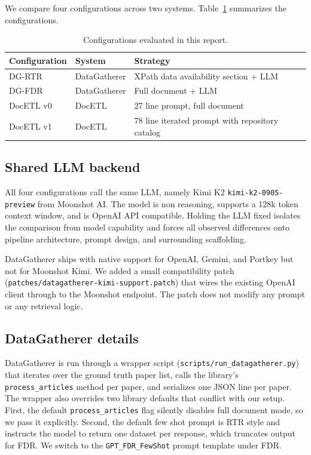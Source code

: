 \documentclass[sigconf,nonacm]{acmart}
\begin{document}
We compare four configurations across two systems. Table~\ref{tab:configs} summarizes the configurations.

\begin{table}[h]
\centering
\small
\begin{tabular}{lll}
\toprule
\textbf{Configuration} & \textbf{System} & \textbf{Strategy} \\
\midrule
DG-RTR     & DataGatherer & XPath data availability section + LLM \\
DG-FDR     & DataGatherer & Full document + LLM \\
DocETL v0  & DocETL       & 27 line prompt, full document \\
DocETL v1  & DocETL       & 78 line iterated prompt with repository catalog \\
\bottomrule
\end{tabular}
\caption{Configurations evaluated in this report.}
\label{tab:configs}
\end{table}

\subsection{Shared LLM backend}

All four configurations call the same LLM, namely Kimi K2 \texttt{kimi-k2-0905-preview} from Moonshot AI. The model is non reasoning, supports a 128k token context window, and is OpenAI API compatible. Holding the LLM fixed isolates the comparison from model capability and forces all observed differences onto pipeline architecture, prompt design, and surrounding scaffolding.

DataGatherer ships with native support for OpenAI, Gemini, and Portkey but not for Moonshot Kimi. We added a small compatibility patch (\texttt{patches/datagatherer-kimi-support.patch}) that wires the existing OpenAI client through to the Moonshot endpoint. The patch does not modify any prompt or any retrieval logic.

\subsection{DataGatherer details}

DataGatherer is run through a wrapper script (\texttt{scripts/run\_datagatherer.py}) that iterates over the ground truth paper list, calls the library's \texttt{process\_articles} method per paper, and serializes one JSON line per paper. The wrapper also overrides two library defaults that conflict with our setup. First, the default \texttt{process\_articles} flag silently disables full document mode, so we pass it explicitly. Second, the default few shot prompt is RTR style and instructs the model to return one dataset per response, which truncates output for FDR. We switch to the \texttt{GPT\_FDR\_FewShot} prompt template under FDR.
\end{document}
